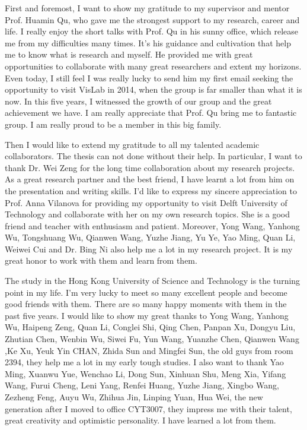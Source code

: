 \acknowledgments
First and foremost, I want to show my gratitude to my supervisor and mentor Prof. Huamin Qu, who gave me the strongest support to my research, career and life. I really enjoy the short talks with Prof. Qu in his sunny office, which release me from my difficulties many times.  It’s his guidance and cultivation that help me to know what is research and myself. He provided me with great opportunities to collaborate with many great researchers and extent my horizons. Even today, I still feel I was really lucky to send him my first email seeking the opportunity to visit VisLab in 2014, when the group is far smaller than what it is now. In this five years, I witnessed the growth of our group and the great achievement we have. I am really appreciate that Prof. Qu bring me to fantastic group. I am really proud to be a member in this big family. 

Then I would like to extend my gratitude to all my talented academic collaborators. The thesis can not done without their help. 
In particular, I want to thank Dr. Wei Zeng for the long time collaboration about my research projects. As a great research partner and the best friend, I have learnt a lot from him on the presentation and writing skills. 
I’d like to express my sincere appreciation to Prof. Anna Vilanova for providing my opportunity to visit Delft University of Technology and collaborate with her on my own research topics. She is a good friend and teacher with enthusiasm and patient. 
Moreover, Yong Wang, Yanhong Wu, Tongshuang Wu, Qianwen Wang, Yuzhe Jiang, Yu Ye, Yao Ming, Quan Li, Weiwei Cui and Dr. Bing Ni also help me a lot in my research project. It is my great honor to work with them and learn from them. 

The study in the Hong Kong University of Science and Technology is the turning point in my life. I'm very lucky to meet so many excellent people and become good friends with them. There are so many happy moments with them in the past five years. I would like to show my great thanks to Yong Wang, Yanhong Wu, Haipeng Zeng, Quan Li, Conglei Shi, Qing Chen, Panpan Xu, Dongyu Liu, Zhutian Chen, Wenbin Wu, Siwei Fu, Yun Wang, Yuanzhe Chen, Qianwen Wang ,Ke Xu, Yeuk Yin CHAN, Zhida Sun and Mingfei Sun, the old guys from room 2394, they help me a lot in my early tough studies. I also want to thank Yao Ming, Xuanwu Yue, Wenchao Li, Dong Sun, Xinhuan Shu, Meng Xia, Yifang Wang, Furui Cheng, Leni Yang, Renfei Huang, Yuzhe Jiang, Xingbo Wang, Zezheng Feng, Auyu Wu, Zhihua Jin, Linping Yuan, Hua Wei, the new generation after I moved to office CYT3007, they impress me with their talent, great creativity and optimistic personality. I have learned a lot from them. 


